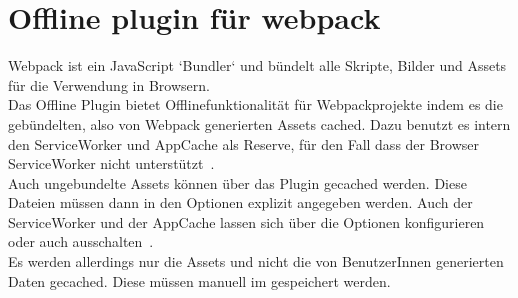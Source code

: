\section{Offline plugin für webpack}
Webpack ist ein JavaScript `Bundler` und bündelt alle Skripte, Bilder und \gls{Assets} für die Verwendung in Browsern.\\
Das Offline Plugin bietet Offlinefunktionalität für Webpackprojekte indem es die gebündelten, also von Webpack generierten \gls{Assets} cached.
Dazu benutzt es intern den ServiceWorker und AppCache als Reserve, für den Fall dass der Browser ServiceWorker nicht unterstützt~\cite{webpack-gh}.\\
Auch ungebundelte \gls{Assets} können über das Plugin gecached werden. Diese Dateien müssen dann in den Optionen explizit angegeben werden. Auch der ServiceWorker und der AppCache lassen sich über die Optionen konfigurieren oder auch ausschalten~\cite{webpack-opt}.\\
Es werden allerdings nur die \gls{Assets} und nicht die von BenutzerInnen generierten Daten gecached. Diese müssen manuell im gespeichert werden.